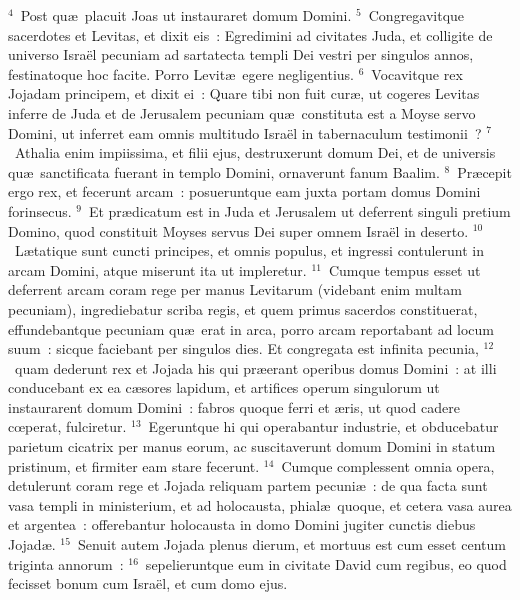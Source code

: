 ${}^{4}$~Post qu\ae\ placuit Joas ut instauraret domum Domini.
${}^{5}$~Congregavitque sacerdotes et Levitas, et dixit eis~: Egredimini ad civitates Juda, et colligite de universo Isra\"el pecuniam ad sartatecta templi Dei vestri per singulos annos, festinatoque hoc facite. Porro Levit\ae\ egere negligentius.
${}^{6}$~Vocavitque rex Jojadam principem, et dixit ei~: Quare tibi non fuit cur\ae , ut cogeres Levitas inferre de Juda et de Jerusalem pecuniam qu\ae\ constituta est a Moyse servo Domini, ut inferret eam omnis multitudo Isra\"el in tabernaculum testimonii~?
${}^{7}$~Athalia enim impiissima, et filii ejus, destruxerunt domum Dei, et de universis qu\ae\ sanctificata fuerant in templo Domini, ornaverunt fanum Baalim.
${}^{8}$~Pr\ae cepit ergo rex, et fecerunt arcam~: posueruntque eam juxta portam domus Domini forinsecus.
${}^{9}$~Et pr\ae dicatum est in Juda et Jerusalem ut deferrent singuli pretium Domino, quod constituit Moyses servus Dei super omnem Isra\"el in deserto.
${}^{10}$~L\ae tatique sunt cuncti principes, et omnis populus, et ingressi contulerunt in arcam Domini, atque miserunt ita ut impleretur.
${}^{11}$~Cumque tempus esset ut deferrent arcam coram rege per manus Levitarum (videbant enim multam pecuniam), ingrediebatur scriba regis, et quem primus sacerdos constituerat, effundebantque pecuniam qu\ae\ erat in arca, porro arcam reportabant ad locum suum~: sicque faciebant per singulos dies. Et congregata est infinita pecunia,
${}^{12}$~quam dederunt rex et Jojada his qui pr\ae erant operibus domus Domini~: at illi conducebant ex ea c\ae sores lapidum, et artifices operum singulorum ut instaurarent domum Domini~: fabros quoque ferri et \ae ris, ut quod cadere cœperat, fulciretur.
${}^{13}$~Egeruntque hi qui operabantur industrie, et obducebatur parietum cicatrix per manus eorum, ac suscitaverunt domum Domini in statum pristinum, et firmiter eam stare fecerunt.
${}^{14}$~Cumque complessent omnia opera, detulerunt coram rege et Jojada reliquam partem pecuni\ae~: de qua facta sunt vasa templi in ministerium, et ad holocausta, phial\ae\ quoque, et cetera vasa aurea et argentea~: offerebantur holocausta in domo Domini jugiter cunctis diebus Jojad\ae .
${}^{15}$~Senuit autem Jojada plenus dierum, et mortuus est cum esset centum triginta annorum~:
${}^{16}$~sepelieruntque eum in civitate David cum regibus, eo quod fecisset bonum cum Isra\"el, et cum domo ejus.


